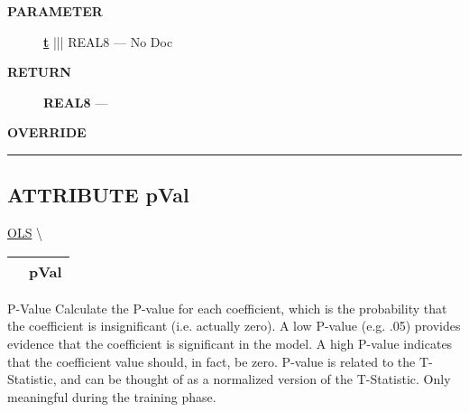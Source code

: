 \par
\begin{description}
\item [\colorbox{tagtype}{\color{white} \textbf{\textsf{PARAMETER}}}] \textbf{\underline{t}} ||| REAL8 --- No Doc
\end{description}







\par
\begin{description}
\item [\colorbox{tagtype}{\color{white} \textbf{\textsf{RETURN}}}] \textbf{REAL8} --- 
\end{description}






\par
\begin{description}
\item [\colorbox{tagtype}{\color{white} \textbf{\textsf{OVERRIDE}}}] 
\end{description}



\rule{\linewidth}{0.5pt}


\subsection*{\textsf{\colorbox{headtoc}{\color{white} ATTRIBUTE}
pVal}}

\hypertarget{ecldoc:linearregression.ols.pval}{}
\hspace{0pt} \hyperlink{ecldoc:linearregression.ols}{OLS} \textbackslash 

{\renewcommand{\arraystretch}{1.5}
\begin{tabularx}{\textwidth}{|>{\raggedright\arraybackslash}l|X|}
\hline
\hspace{0pt}\mytexttt{\color{red} } & \textbf{pVal} \\
\hline
\end{tabularx}
}

\par





P-Value Calculate the P-value for each coefficient, which is the probability that the coefficient is insignificant (i.e. actually zero). A low P-value (e.g. .05) provides evidence that the coefficient is significant in the model. A high P-value indicates that the coefficient value should, in fact, be zero. P-value is related to the T-Statistic, and can be thought of as a normalized version of the T-Statistic. Only meaningful during the training phase.








